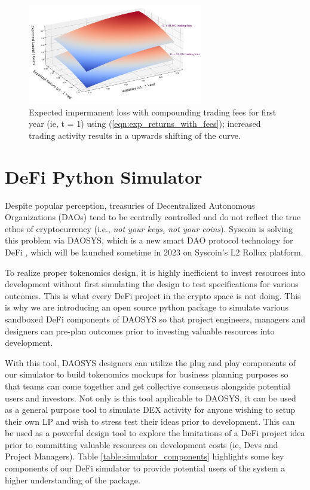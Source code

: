 \documentclass[journal,twocolumn,12pt]{ieeesyscoin}
\begin{document}
\begin{figure}[h!]
\includegraphics[width=3in]{img/imp_loss_compounding_fees.png}
\caption{Expected impermanent loss with compounding trading fees for first year (ie, t = 1)  using (\ref{eqn:exp_returns_with_fees}); increased trading activity results in a upwards shifting of the curve.}
\label{fig:imp_loss_compounding_fees}
\end{figure}

\section{DeFi Python Simulator}
\label{sec:python_simulator}

Despite popular perception, treasuries of Decentralized Autonomous Organizations (DAOs) tend to be centrally controlled and do not reflect the true ethos of cryptocurrency (i.e., \textit{not your keys, not your coins}). Syscoin is solving this problem via DAOSYS, which is a new smart DAO protocol technology for DeFi \cite{Doge22}, which will be launched sometime in 2023 on Syscoin's L2 Rollux platform.

To realize proper tokenomics design, it is highly inefficient to invest resources into development without first simulating the design to test specifications for various outcomes. This is what every DeFi project in the crypto space is not doing. This is why we are introducing an open source python package to simulate various sandboxed DeFi components of DAOSYS so that project engineers, managers and designers can pre-plan outcomes prior to investing valuable resources into development. 

With this tool, DAOSYS designers can utilize the plug and play components of our simulator to build tokenomics mockups for business planning purposes so that teams can come together and get collective consensus alongside potential users and investors. Not only is this tool applicable to DAOSYS, it can be used as a general purpose tool to simulate DEX activity for anyone wishing to setup their own LP and wish to stress test their ideas prior to development. This can be used as a powerful design tool to explore the limitations of a DeFi project idea prior to committing valuable resources on development costs (ie, Devs and Project Managers). Table \ref{table:simulator_components} highlights some key components of our DeFi simulator to provide potential users of the system a higher understanding of the package.
\end{document}
